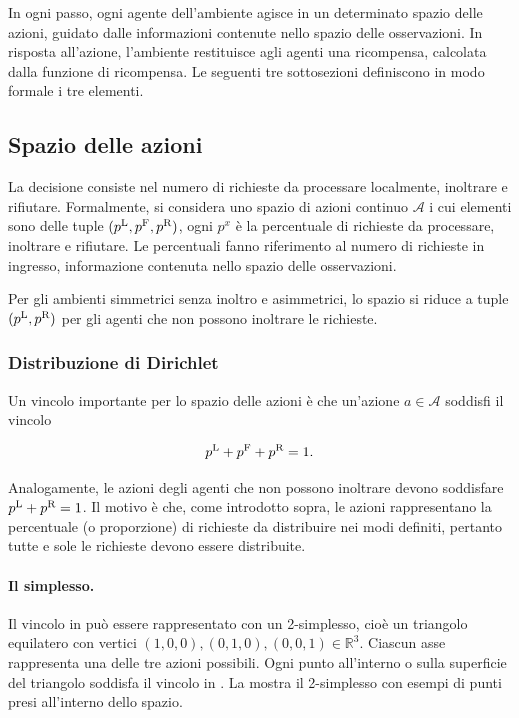 In ogni passo, ogni agente dell'ambiente agisce in un determinato spazio delle azioni, guidato dalle informazioni contenute nello spazio delle osservazioni. In risposta all'azione, l'ambiente restituisce agli agenti una ricompensa, calcolata dalla funzione di ricompensa. Le seguenti tre sottosezioni definiscono in modo formale i tre elementi.

\subsection{Spazio delle azioni}

La decisione consiste nel numero di richieste da processare localmente, inoltrare e rifiutare. Formalmente, si considera uno spazio di azioni continuo $\mathcal{A}$ i cui elementi sono delle tuple $(p^\textnormal{L}, p^\textnormal{F}, p^\textnormal{R})$, ogni $p^x$ è la percentuale di richieste da processare, inoltrare e rifiutare. Le percentuali fanno riferimento al numero di richieste in ingresso, informazione contenuta nello spazio delle osservazioni.

Per gli ambienti simmetrici senza inoltro e asimmetrici, lo spazio si riduce a tuple $(p^\textnormal{L}, p^\textnormal{R})$ per gli agenti che non possono inoltrare le richieste.

\subsubsection{Distribuzione di Dirichlet}

Un vincolo importante per lo spazio delle azioni è che un'azione $a \in \mathcal{A}$ soddisfi il vincolo

\begin{equation}\label{eq:4_simplex_condition}
    p^\textnormal{L} + p^\textnormal{F} + p^\textnormal{R} = 1.
\end{equation}

Analogamente, le azioni degli agenti che non possono inoltrare devono soddisfare $p^\textnormal{L} + p^\textnormal{R} = 1$. Il motivo è che, come introdotto sopra, le azioni rappresentano la percentuale (o proporzione) di richieste da distribuire nei modi definiti, pertanto tutte e sole le richieste devono essere distribuite.

\paragraph{Il simplesso.} Il vincolo in  può essere rappresentato con un \mbox{2-simplesso}, cioè un triangolo equilatero con vertici $(1, 0, 0), (0, 1, 0), (0, 0, 1) \in \mathbb{R}^3$. Ciascun asse rappresenta una delle tre azioni possibili. Ogni punto all'interno o sulla superficie del triangolo soddisfa il vincolo in . La  mostra il 2-simplesso con esempi di punti presi all'interno dello spazio.

